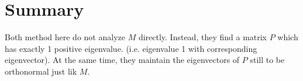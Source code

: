 \documentclass{article}
\begin{document}
\section{Summary}
Both method here do not analyze $M$ directly.
Instead, they find a matrix $P$ which has exactly 1 positive eigenvalue. (i.e. eigenvalue 1 with corresponding eigenvector).
At the same time, they maintain the eigenvectors of $P$ still to be orthonormal just lik $M$.



\end{document}
